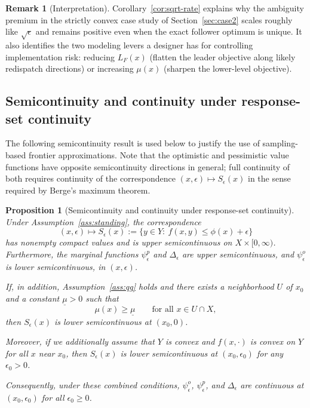 \documentclass[11pt]{article}
\newtheorem{proposition}[theorem]{Proposition}
\theoremstyle{definition}
\newtheorem{remark}[theorem]{Remark}
\newcommand{\eps}{\epsilon}
\begin{document}
\begin{remark}[Interpretation]\label{rem:sqrt}
Corollary~\ref{cor:sqrt-rate} explains why the ambiguity premium
in the strictly convex case study of
Section~\ref{sec:case2} scales roughly like $\sqrt\eps$ and
remains positive even when the exact follower optimum is unique.
It also identifies the two modeling levers a designer has for
controlling implementation risk: reducing $L_F(x)$ (flatten the
leader objective along likely redispatch directions) or
increasing $\mu(x)$ (sharpen the lower-level objective).
\end{remark}

\subsection{Semicontinuity and continuity under response-set
continuity}
The following semicontinuity result is used below to justify the
use of sampling-based frontier approximations. Note that the
optimistic and pessimistic value functions have opposite
semicontinuity directions in general; full continuity of both
requires continuity of the correspondence
$(x,\eps)\mapsto S_\eps(x)$ in the sense required by Berge's
maximum theorem.

\begin{proposition}[Semicontinuity and continuity under response-set
continuity]\label{prop:continuity}
Under Assumption~\ref{ass:standing}, the correspondence
\[
(x,\eps)\longmapsto S_\eps(x):=\{y\in Y:\ f(x,y)\le \phi(x)+\eps\}
\]
has nonempty compact values and is upper semicontinuous on
$X\times[0,\infty)$. Furthermore, the marginal functions
$\psi_\eps^p$ and $\Delta_\eps$ are upper semicontinuous, and
$\psi_\eps^o$ is lower semicontinuous, in $(x,\eps)$.

If, in addition, Assumption~\ref{ass:qg} holds and there exists a
neighborhood $U$ of $x_0$ and a constant $\underline\mu>0$ such
that
\[
\mu(x)\ge \underline\mu\qquad \text{for all }x\in U\cap X,
\]
then $S_\eps(x)$ is lower semicontinuous at $(x_0,0)$.

Moreover, if we additionally assume that $Y$ is convex and
$f(x,\cdot)$ is convex on $Y$ for all $x$ near $x_0$, then
$S_\eps(x)$ is lower semicontinuous at $(x_0,\eps_0)$ for any
$\eps_0>0$.

Consequently, under these combined conditions,
$\psi_\eps^o$, $\psi_\eps^p$, and $\Delta_\eps$ are continuous at
$(x_0,\eps_0)$ for all $\eps_0\ge 0$.
\end{proposition}
\end{document}

